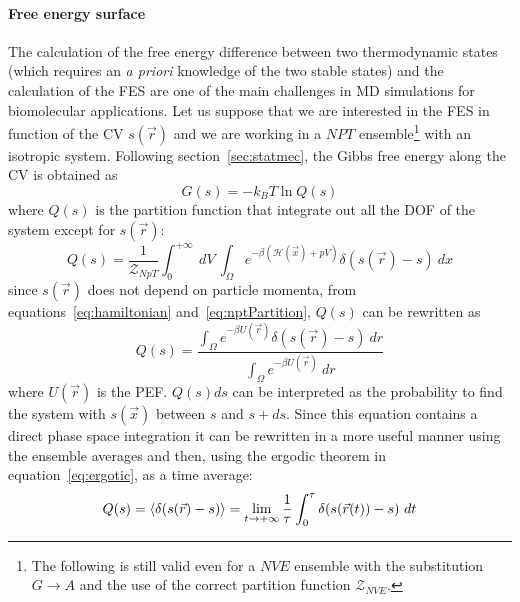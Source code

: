 \paragraph{\textbf{Free energy surface}} The calculation of the free energy difference between two thermodynamic
states (which requires an \textit{a priori} knowledge of the two stable states) and the calculation of the
\ac{FES} are one of the main challenges in \ac{MD} simulations for biomolecular applications. Let us suppose that
we are interested in the \ac{FES} in function of the \ac{CV} $s(\vec r)$ and we are working in a $NPT$
ensemble\footnote{The following is still valid even for a $NVE$ ensemble with the substitution $G\rightarrow A$
and the use of the correct partition function $\mathcal{Z}_{NVE}$.} with an isotropic system. Following
section~\ref{sec:statmec}, the Gibbs free energy along the \ac{CV} is obtained as
\begin{equation}
	G(s) = -k_BT \ln Q(s)
	\label{eq:fes}
\end{equation}
where $Q(s)$ is the partition function that integrate out all the \ac{DOF} of the system except for $s(\vec r)$:
\begin{equation*}
	Q(s) = \frac{1}{\mathcal{Z}_{NpT}} \int_0^{+\infty}\ dV \ \int_\Omega e^{-\beta(\mathcal{H}(\vec x) + pV)}\delta(s(\vec r) - s)\ dx
\end{equation*}
since $s(\vec r)$ does not depend on particle momenta, from equations~\eqref{eq:hamiltonian}
and~\eqref{eq:nptPartition}, $Q(s)$ can be rewritten as
\begin{equation}
	Q(s) =  \frac{ \int_\Omega e^{-\beta U(\vec r)}\delta(s(\vec r) - s)\ dr }{\int_\Omega e^{-\beta U(\vec r)}\ dr}%
	\label{eq:CVprobability}
\end{equation}
where $U(\vec r)$ is the \ac{PEF}. $Q(s)ds$ can be interpreted as the probability to find the system with
$s(\vec x)$ between $s$ and $s + ds$. Since this equation contains a direct phase space integration it can be
rewritten in a more useful manner using the ensemble averages and then, using the ergodic theorem in
equation~\eqref{eq:ergotic}, as a time average:
\begin{equation}
	Q(s) = \left \langle \delta(s(\vec r) - s) \right \rangle = \lim_{t\to +\infty}\frac{1}{\tau}\int_0^\tau \delta(s(\vec r(t)) - s)\ dt
	\label{eq:CVprobabilityAve}
\end{equation}

